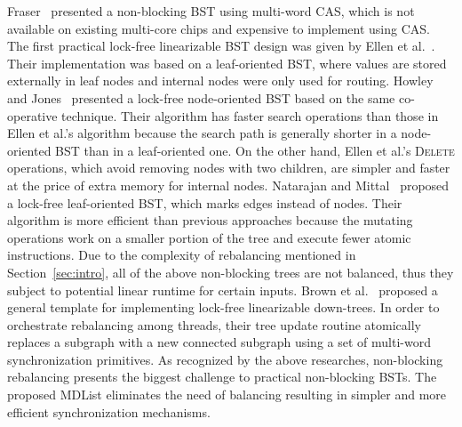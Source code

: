 \documentclass[10pt,conference,compsocconf]{IEEEtran}
\begin{document}
Fraser~\cite{fraser2004practical} presented a non-blocking BST using multi-word CAS, which is not available on existing multi-core chips and expensive to implement using CAS. 
The first practical lock-free linearizable BST design was given by Ellen et al.~\cite{ellen2010non}.
Their implementation was based on a leaf-oriented BST, where values are stored externally in leaf nodes and internal nodes were only used for routing.
Howley and Jones~\cite{howley2012non} presented a lock-free node-oriented BST based on the same co-operative technique.
Their algorithm has faster search operations than those in Ellen et al.'s algorithm because the search path is generally shorter in a node-oriented BST than in a leaf-oriented one.
On the other hand, Ellen et al.'s \textsc{Delete} operations, which avoid removing nodes with two children, are simpler and faster at the price of extra memory for internal nodes.
Natarajan and Mittal~\cite{natarajan2014fast} proposed a lock-free leaf-oriented BST, which marks edges instead of nodes.
Their algorithm is more efficient than previous approaches because the mutating operations work on a smaller portion of the tree and execute fewer atomic instructions.
Due to the complexity of rebalancing mentioned in Section~\ref{sec:intro}, all of the above non-blocking trees are not balanced, thus they subject to potential linear runtime for certain inputs.
Brown et al.~\cite{brown2014general} proposed a general template for implementing lock-free linearizable down-trees.
In order to orchestrate rebalancing among threads, their tree update routine atomically replaces a subgraph with a new connected subgraph using a set of multi-word synchronization primitives.
As recognized by the above researches, non-blocking rebalancing presents the biggest challenge to practical non-blocking BSTs.
The proposed MDList eliminates the need of balancing resulting in simpler and more efficient synchronization mechanisms.

\end{document}
